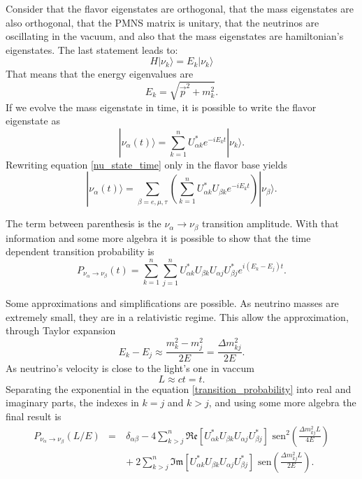 Consider that the flavor eigenstates are orthogonal, that the mass eigenstates are also orthogonal, that the PMNS matrix is unitary, that the neutrinos are oscillating in the vacuum, and also that the mass eigenstates are hamiltonian's eigenstates. The last statement leads to:
%
\begin{equation}
	H|\nu_k \rangle = E_k |\nu_k \rangle
	\label{nu_schrodinger}
\end{equation}
%
That means that the energy eigenvalues are
%
\begin{equation}
	E_k = \sqrt{\vec{p}^2 + m_k^2}.
	\label{nu_energy}
\end{equation}
%
If we evolve the mass eigenstate in time, it is possible to write the flavor eigenstate as
%
\begin{equation}
	|\nu_\alpha (t) \rangle = \sum_{k=1}^n U^*_{\alpha k} e^{-iE_kt}|\nu_k \rangle.
	\label{nu_state_time}
\end{equation}
%
Rewriting equation \ref{nu_state_time} only in the flavor base yields 
%
\begin{equation}
	|\nu_\alpha (t)\rangle = \sum_{\beta = e, \mu, \tau} \left( \sum_{k=1}^n U^*_{\alpha k} U_{\beta k} e^{-iE_kt} \right) |\nu_\beta \rangle.
	\label{nu_state_time_2}
\end{equation}
%

The term between parenthesis is the $\nu_\alpha \rightarrow \nu_\beta$ transition amplitude. With that information and some more algebra it is possible to show that the time dependent transition probability is
\begin{equation}
	P_{\nu_\alpha \rightarrow \nu_\beta}(t) = \sum_{k=1}^n \sum_{j=1}^n U^*_{\alpha k} U_{\beta k} U_{\alpha j} U^*_{\beta j} e^{i(E_k - E_j)t}.
	\label{transition_probability}
\end{equation}

Some approximations and simplifications are possible. As neutrino masses are extremely small, they are in a relativistic regime. This allow the approximation, through Taylor expansion 
%
\begin{equation}
	E_k - E_j \approx \frac{m^2_k - m^2_j}{2E} = \frac{\Delta m^2_{kj}}{2E}.
	\label{nu_Ej-Ek}
\end{equation}
%
As neutrino's velocity is close to the light's one in vaccum 
%
\begin{equation}
	L \approx ct = t.
	\label{nu_L}
\end{equation}
%
Separating the exponential in the equation \ref{transition_probability} into real and imaginary parts, the indexes in $k=j$ and $k>j$, and using some more algebra the final result is
%
\begin{eqnarray}
	P_{\nu_\alpha \rightarrow \nu_\beta} (L/E) & = & \delta_{\alpha\beta} - 4\sum_{k>j}^n  \mathfrak{Re}[U^*_{\alpha k} U_{\beta k} U_{\alpha j} U^*_{\beta j}]\text{ sen}^2\left(\frac{\Delta m^2_{kj} L}{4E} \right) \nonumber \\
	& \quad & + \ 2\sum_{k>j}^n\mathfrak{Im}[U^*_{\alpha k} U_{\beta k} U_{\alpha j} U^*_{\beta j}]\text{ sen}\left(\frac{\Delta m^2_{kj} L}{2E} \right).
	\label{nu_oscillation_final}
\end{eqnarray}
%

